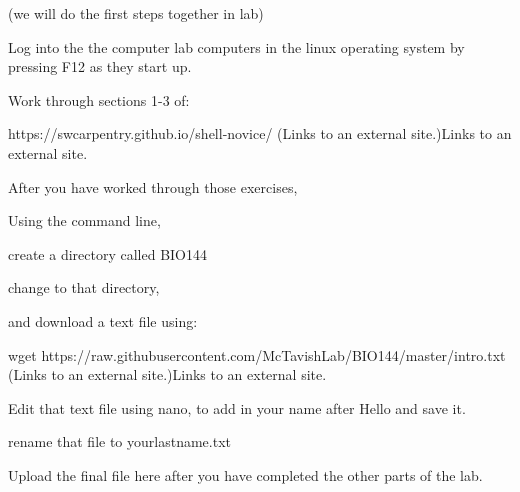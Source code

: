 \documentclass[a4paper,10pt]{article}
\title{}
\author{}
\date{}
\begin{document}
\maketitle

(we will do the first steps together in lab)

Log into the the computer lab computers in the linux operating system by pressing F12 as they start up.

 Work through sections 1-3 of:

https://swcarpentry.github.io/shell-novice/ (Links to an external site.)Links to an external site.

 

After you have worked through those exercises,

Using the command line,

create a directory called BIO144

 change to that directory,

and download a text file using:

    wget https://raw.githubusercontent.com/McTavishLab/BIO144/master/intro.txt (Links to an external site.)Links to an external site.

Edit that text file using nano, to add in your name after Hello and save it.

rename that file to yourlastname.txt

Upload the final file here after you have completed the other parts of the lab.
\end{document}
